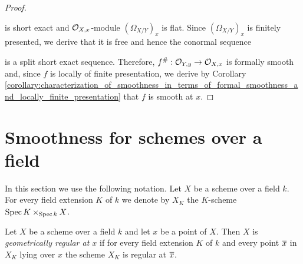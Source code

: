 \begin{proof}
\begin{center}
\end{center}
is short exact and ${\mathcal O}_{X,x}$-module $(\Omega_{X/Y})_x$ is flat. Since $(\Omega_{X/Y})_x$ is finitely presented, we derive that it is free and hence the conormal sequence
\begin{center}
\end{center}
is a split short exact sequence. Therefore, $f^{\#}:{\mathcal O}_{Y,y}\rightarrow {\mathcal O}_{X,x}$ is formally smooth and, since $f$ is locally of finite presentation, we derive by Corollary \ref{corollary:characterization_of_smoothness_in_terms_of_formal_smoothness_and_locally_finite_presentation} that $f$ is smooth at $x$.
\end{proof}

\section{Smoothness for schemes over a field}
\noindent
In this section we use the following notation. Let $X$ be a scheme over a field $k$. For every field extension $K$ of $k$ we denote by $X_K$ the $K$-scheme $\mathrm{Spec}\, K \times_{\mathrm{Spec}\, k}X$.

\begin{definition}
Let $X$ be a scheme over a field $k$ and let $x$ be a point of $X$. Then $X$ is \textit{geometrically regular at $x$} if for every field extension $K$ of $k$ and every point $\overline{x}$ in $X_K$ lying over $x$ the scheme $X_K$ is regular at $\overline{x}$.
\end{definition}

